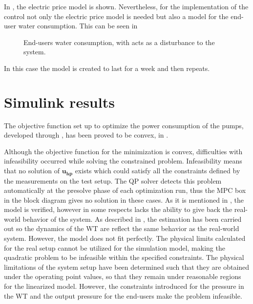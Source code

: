 In , the electric price model is shown. Nevertheless, for the implementation of the control not only the electric price model is needed but also a model for the end-user water consumption. This can be seen in 

\begin{figure}[H]
\centering
 
\caption{End-users water consumption, with acts as a disturbance to the system.}
\label{fig:water_consumption}
\end{figure}

In this case the model is created to last for a week and then repeats. 


\section{Simulink results}
The objective function set up to optimize the power consumption of the pumps, developed through , has been proved to be convex, in . 


Although the objective function for the minimization is convex, difficulties with infeasibility occurred while solving the constrained problem. Infeasibility means that no solution of $\bm{u_{hp}}$ exists which could satisfy all the constraints defined by the measurements on the test setup. The QP solver detects this problem automatically at the presolve phase of each optimization run, thus the MPC box in the block diagram gives no solution in these cases. As it is mentioned in , the model is verified, however in some respects lacks the ability to give back the real-world behavior of the system. As described in , the estimation has been carried out so the dynamics of the WT are reflect the same behavior as the real-world system. However, the model does not fit perfectly. The physical limits calculated for the real setup cannot be utilized for the simulation model, making the quadratic problem to be infeasible within the specified constraints. The physical limitations of the system setup have been determined such that they are obtained under the operating point values, so that they remain under reasonable regions for the linearized model. However, the constraints introduced for the pressure in the WT and the output pressure for the end-users make the problem infeasible. 

